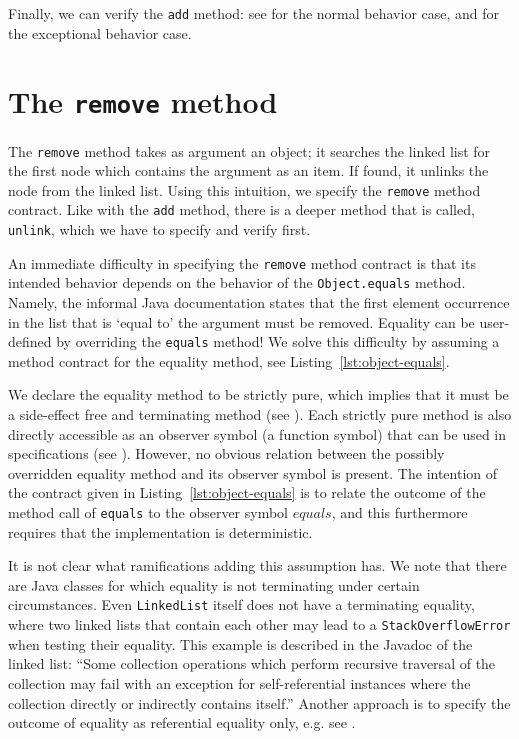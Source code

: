 \documentclass[runningheads]{llncs}
\begin{document}
Finally, we can verify the \texttt{add} method: see  for the normal behavior case, and  for the exceptional behavior case.

\section{The \texttt{remove} method}\label{sec:remove}

The \texttt{remove} method takes as argument an object; it searches the linked list for the first node which contains the argument as an item. If found, it unlinks the node from the linked list. Using this intuition, we specify the \texttt{remove} method contract. Like with the \texttt{add} method, there is a deeper method that is called, \texttt{unlink}, which we have to specify and verify first.

An immediate difficulty in specifying the \texttt{remove} method contract is that its intended behavior depends on the behavior of the \texttt{Object.equals} method. Namely, the informal Java documentation states that the first element occurrence in the list that is `equal to' the argument must be removed. Equality can be user-defined by overriding the \texttt{equals} method! We solve this difficulty by assuming a method contract for the equality method, see Listing~\ref{lst:object-equals}.



We declare the equality method to be strictly pure, which implies that it must be a side-effect free and terminating method (see \cite[Section 7.3.5]{KeYbook}). Each strictly pure method is also directly accessible as an observer symbol (a function symbol) that can be used in specifications (see \cite[Section 8.1.2]{KeYbook}). However, no obvious relation between the possibly overridden equality method and its observer symbol is present. The intention of the contract given in Listing~\ref{lst:object-equals} is to relate the outcome of the method call of \texttt{equals} to the observer symbol $\mathit{equals}$, and this furthermore requires that the implementation is deterministic.

It is not clear what ramifications adding this assumption has. We note that there are Java classes for which equality is not terminating under certain circumstances. Even \texttt{LinkedList} itself does not have a terminating equality, where two linked lists that contain each other may lead to a \texttt{StackOverflowError} when testing their equality. This example is described in the Javadoc \cite{javadoc8collection} of the linked list: ``Some collection operations which perform recursive traversal of the collection may fail with an exception for self-referential instances where the collection directly or indirectly contains itself.'' Another approach is to specify the outcome of equality as referential equality only, e.g. see \cite[Section 4.4]{huisman2002verification}.
\end{document}
